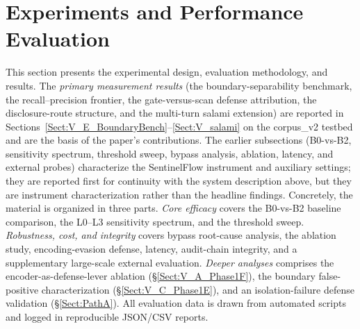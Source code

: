 \documentclass[journal]{IEEEtran}
\begin{document}
\section{Experiments and Performance Evaluation}
\label{Sect:Experimental_Procedure_Performance_Evaluation}
This section presents the experimental design, evaluation methodology, and results. The \emph{primary measurement results} (the boundary-separability benchmark, the recall--precision frontier, the gate-versus-scan defense attribution, the disclosure-route structure, and the multi-turn salami extension) are reported in Sections~\ref{Sect:V_E_BoundaryBench}--\ref{Sect:V_salami} on the corpus\_v2 testbed and are the basis of the paper's contributions. The earlier subsections (B0-vs-B2, sensitivity spectrum, threshold sweep, bypass analysis, ablation, latency, and external probes) characterize the SentinelFlow instrument and auxiliary settings; they are reported first for continuity with the system description above, but they are instrument characterization rather than the headline findings. Concretely, the material is organized in three parts. \emph{Core efficacy} covers the B0-vs-B2 baseline comparison, the L0--L3 sensitivity spectrum, and the threshold sweep. \emph{Robustness, cost, and integrity} covers bypass root-cause analysis, the ablation study, encoding-evasion defense, latency, audit-chain integrity, and a supplementary large-scale external evaluation. \emph{Deeper analyses} comprises the encoder-as-defense-lever ablation (\S\ref{Sect:V_A_Phase1F}), the boundary false-positive characterization (\S\ref{Sect:V_C_Phase1E}), and an isolation-failure defense validation (\S\ref{Sect:PathA}). All evaluation data is drawn from automated scripts and logged in reproducible JSON/CSV reports.

\begin{table}[!t]
\centering
\caption{Reading guide for Section~\ref{Sect:Experimental_Procedure_Performance_Evaluation}: which results are the headline findings and which characterize the instrument.}
\label{tab:reading_guide}
\end{table}
\end{document}

